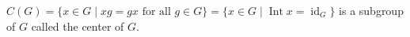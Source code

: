 $C(G) = \{x \in G \mid xg = gx \text{ for all } g \in G\} = \{x \in G \mid \operatorname{Int} x = \operatorname{id}_G\}$ is a subgroup of $G$ called the center of $G$.
